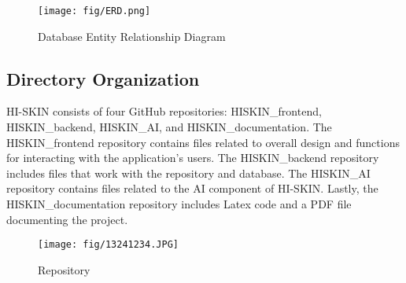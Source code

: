 \documentclass[conference]{IEEEtran}
\begin{document}
\begin{figure}[h]
    \centering
    \texttt{[image: fig/ERD.png]}
    \label{fig:Database Entity Relationship Diagram}
    \caption{Database Entity Relationship Diagram} 
    \end{figure}

\subsection{Directory Organization}
HI-SKIN consists of four GitHub repositories: HISKIN\_frontend, HISKIN\_backend, HISKIN\_AI, and HISKIN\_documentation. The HISKIN\_frontend repository contains files related to overall design and functions for interacting with the application's users. The HISKIN\_backend repository includes files that work with the repository and database. The HISKIN\_AI repository contains files related to the AI component of HI-SKIN. Lastly, the HISKIN\_documentation repository includes Latex code and a PDF file documenting the project.  \\
\begin{figure}[h]
    \centering
    \texttt{[image: fig/13241234.JPG]}
    \label{fig:Repository}
    \caption{Repository} 
    \end{figure}
\end{document}
